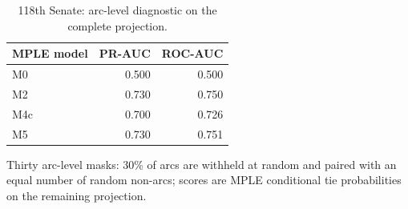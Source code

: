 \begin{table}[tbp]
\centering
\small
\caption{118th Senate: arc-level diagnostic on the complete projection.}
\label{tab:static-diagnostic}
\begin{tabular}{lrr}
\toprule
MPLE model & PR-AUC & ROC-AUC \\
\midrule
M0 & 0.500 & 0.500 \\
M2 & 0.730 & 0.750 \\
M4c & 0.700 & 0.726 \\
M5 & 0.730 & 0.751 \\
\bottomrule
\end{tabular}
\par\vspace{2pt}\footnotesize Thirty arc-level masks: 30\% of arcs are withheld at random and paired with an equal number of random non-arcs; scores are MPLE conditional tie probabilities on the remaining projection.
\end{table}